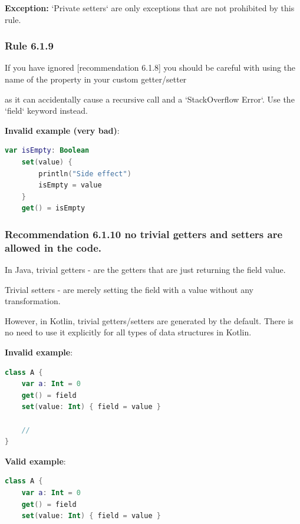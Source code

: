 {{{{\textbf{Exception:} `Private setters` are only exceptions that are not prohibited by this rule.



\subsubsection*{\textbf{Rule 6.1.9}}
\leavevmode\newline

If you have ignored [recommendation 6.1.8] you should be careful with using the name of the property in your custom getter/setter

as it can accidentally cause a recursive call and a `StackOverflow Error`. Use the `field` keyword instead.



\textbf{Invalid example (very bad)}:

\begin{lstlisting}[language=Kotlin]
var isEmpty: Boolean
    set(value) {
        println("Side effect")
        isEmpty = value
    }
    get() = isEmpty
\end{lstlisting}


\subsubsection*{\textbf{Recommendation 6.1.10 no trivial getters and setters are allowed in the code.}}
\leavevmode\newline

In Java, trivial getters - are the getters that are just returning the field value.

Trivial setters - are merely setting the field with a value without any transformation.

However, in Kotlin, trivial getters/setters are generated by the default. There is no need to use it explicitly for all types of data structures in Kotlin.



\textbf{Invalid example}:

\begin{lstlisting}[language=Kotlin]
class A {
    var a: Int = 0
    get() = field
    set(value: Int) { field = value }

    //
}
\end{lstlisting}


\textbf{Valid example}:

\begin{lstlisting}[language=Kotlin]
class A {
    var a: Int = 0
    get() = field
    set(value: Int) { field = value }


\end{lstlisting}}}}}
